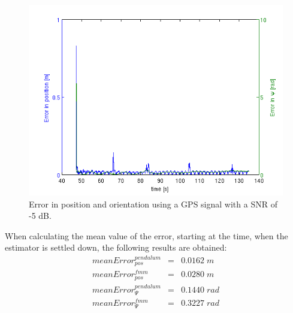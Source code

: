 \begin{figure}[hb]
\centering
\includegraphics[width=1\textwidth]{pictures/2_2_SNR5_errors_GPS.png}
\caption{Error in position and orientation using a GPS signal with a SNR of -5 dB.}
\label{error_5snr}
\end{figure}
When calculating the mean value of the error, starting at the time, when the estimator is settled down, the following results are obtained:
\begin{eqnarray}
meanError_{pos}^{pendulum}&=&0.0162\;m \\ meanError_{pos}^{fmm}&=&0.0280\;m \\ meanError_{\Psi}^{pendulum}&=& 0.1440\;rad\\ meanError_{\Psi}^{fmm}&=& 0.3227 \;rad
\end{eqnarray} 

\FloatBarrier

